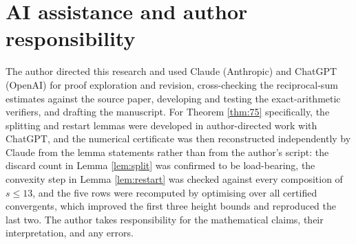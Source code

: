 \documentclass[11pt,a4paper]{article}
\theoremstyle{plain}\newtheorem{theorem}{Theorem}\newtheorem{proposition}[theorem]{Proposition}
\theoremstyle{definition}\newtheorem{example}[theorem]{Example}
\theoremstyle{remark}\newtheorem{remark}[theorem]{Remark}
\begin{document}
\section*{AI assistance and author responsibility}
The author directed this research and used Claude (Anthropic) and ChatGPT (OpenAI) for
proof exploration and revision, cross-checking the reciprocal-sum estimates against the
source paper, developing and testing the exact-arithmetic verifiers, and drafting the
manuscript. For Theorem \ref{thm:75} specifically, the splitting and restart lemmas were
developed in author-directed work with ChatGPT, and the numerical certificate was then
reconstructed independently by Claude from the lemma statements rather than from the author's
script: the discard count in Lemma \ref{lem:split} was confirmed to be load-bearing, the
convexity step in Lemma \ref{lem:restart} was checked against every composition of $s\le13$,
and the five rows were recomputed by optimising over all certified convergents, which improved
the first three height bounds and reproduced the last two. The author takes responsibility for the mathematical
claims, their interpretation, and any errors.


\end{document}
